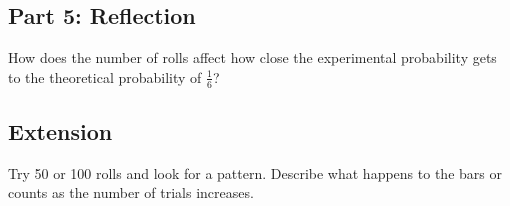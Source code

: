 \vspace{3cm}

\subsection{Part 5: Reflection}\label{part-5-reflection}

How does the number of rolls affect how close the experimental
probability gets to the theoretical probability of \(\frac{1}{6}\)?

\vspace{4cm}

\subsection{Extension}\label{extension}

Try 50 or 100 rolls and look for a pattern. Describe what happens to the
bars or counts as the number of trials increases.

\vspace{3cm}
